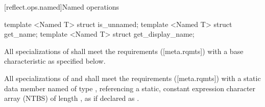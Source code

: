 [reflect.ops.named]{Named operations}

\begin{std.txt}\color{addclr}

\begin{itemdecl}
template <Named T> struct is_unnamed;
template <Named T> struct get_name;
template <Named T> struct get_display_name;
\end{itemdecl}

\begin{itemdescr}
\pnum
All specializations of  shall meet the  requirements ([meta.rqmts]) with a base characteristic as specified below.

\pnum
All specializations of  and  shall meet the  requirements ([meta.rqmts]) with a static data member named  of type , referencing a static, constant expression character array (NTBS) of length , as if declared as .


\end{itemdescr}
\end{std.txt}
